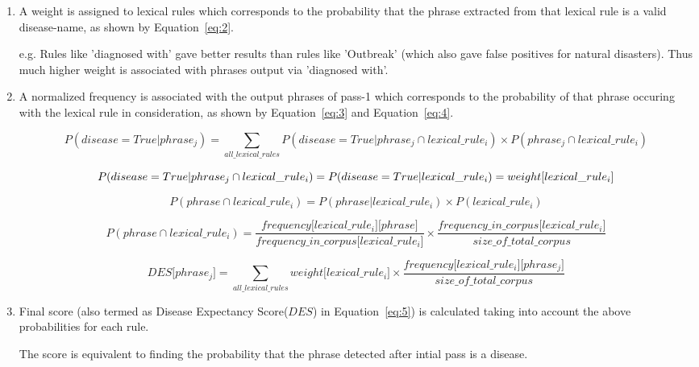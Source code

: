 \documentclass{article}
\begin{document}
\begin{enumerate}

\item  A weight is assigned to lexical rules which corresponds to the probability that the phrase extracted from that lexical rule is a valid disease-name, as shown by Equation~\ref{eq:2}.

e.g. Rules like 'diagnosed with' gave better results than rules like 'Outbreak' (which also gave false positives for natural disasters). Thus much higher weight is associated with phrases output via 'diagnosed with'. 

\item A normalized frequency is associated with the output phrases of pass-1 which corresponds to the probability of that phrase occuring with the lexical rule in consideration, as shown by Equation~\ref{eq:3} and Equation~\ref{eq:4}. 


\begin{figure}[!t]

\begin{equation}
P(disease = True | phrase_j) = \sum_{all\_lexical\_rules} P(disease = True | phrase_j \cap lexical\_rule_i) \times P(phrase_j \cap lexical\_rule_i)
\label{eq:1} 
\end{equation}


\begin{equation}
P(disease = True | phrase_j \cap lexical\_rule_i) = P(disease = True | lexical\_rule_i) \\
 = weight \lbrack lexical\_rule_i \rbrack
\label{eq:2} 
\end{equation}

\begin{equation}
P(phrase \cap lexical\_rule_i) = P( phrase | lexical\_rule_i) \times  P(lexical\_rule_i)
\label{eq:3} 
\end{equation}

\begin{equation}
 P(phrase \cap lexical\_rule_i) = \frac{frequency \lbrack lexical\_rule_i] \lbrack phrase \rbrack  } {frequency\_in\_corpus \lbrack lexical\_rule_i \rbrack} \times \frac{frequency\_in\_corpus \lbrack lexical\_rule_i \rbrack} { size\_of\_total\_corpus}
\label{eq:4}
\end{equation}


\begin{equation}
DES \lbrack phrase_j \rbrack = \sum_{all\_lexical\_rules} weight \lbrack lexical\_rule_i \rbrack \times \frac{frequency \lbrack lexical\_rule_i \rbrack \lbrack phrase_j \rbrack}  {size\_of\_total\_corpus}
\label{eq:5}
\end{equation}




\hrulefill
\end{figure}


\item Final score (also termed as Disease Expectancy Score($DES$) in Equation~\ref{eq:5}) is calculated taking into account the above probabilities for each rule. 

The score is equivalent to finding the probability that the phrase detected after intial pass is a disease.


\end{enumerate}
\end{document}
